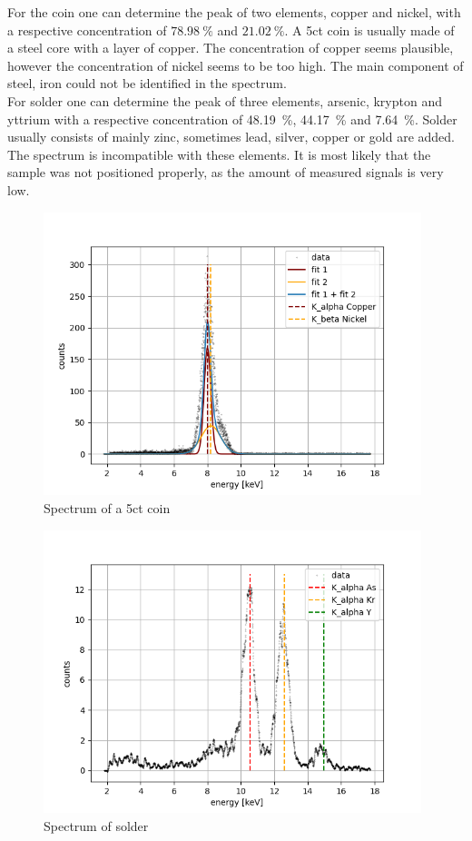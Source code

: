 For the coin one can determine the peak of two elements, copper and nickel, with a respective concentration of $\SI{78.98}{\%}$ and $\SI{21.02}{\%}$. A 5ct coin is usually made of a steel core with a layer of copper. The concentration of copper seems plausible, however the concentration of nickel seems to be too high. The main component of steel, iron could not be identified in the spectrum. \\

For solder one can determine the peak of three elements, arsenic, krypton and yttrium with a respective concentration of \SI{48.19}{\%}, \SI{44.17}{\%} and \SI{7.64}{\%}. Solder usually consists of mainly zinc, sometimes lead, silver, copper or gold are added. The spectrum is incompatible with these elements. It is most likely that the sample was not positioned properly, as the amount of measured signals is very low. \\



\begin{figure}[H]
   
    \centering
    \includegraphics[width=110mm,scale=0.5]{MAX/include/plotsMuenze.png}
    \caption{Spectrum of a 5ct coin}
    \label{figure:coin}
\end{figure}

\begin{figure}[H]
   
    \centering
    \includegraphics[width=110mm,scale=0.5]{MAX/include/plotslzinn.png}
    \caption{Spectrum of solder}
    \label{figure:lzinn}
\end{figure}